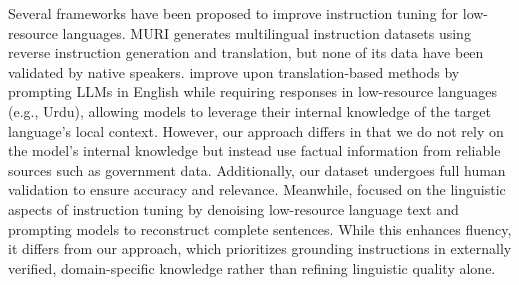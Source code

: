 Several frameworks have been proposed to improve instruction tuning for low-resource languages. MURI \cite{koksal2024muri} generates multilingual instruction datasets using reverse instruction generation and translation, but none of its data have been validated by native speakers. \citet{li-etal-2024-x} improve upon translation-based methods by prompting LLMs in English while requiring responses in low-resource languages (e.g., Urdu), allowing models to leverage their internal knowledge of the target language's local context. However, our approach differs in that we do not rely on the model’s internal knowledge but instead use factual information from reliable sources such as government data. Additionally, our dataset undergoes full human validation to ensure accuracy and relevance. Meanwhile, \citet{cahyawijaya2023instructalign} focused on the linguistic aspects of instruction tuning by denoising low-resource language text and prompting models to reconstruct complete sentences. While this enhances fluency, it differs from our approach, which prioritizes grounding instructions in externally verified, domain-specific knowledge rather than refining linguistic quality alone.




